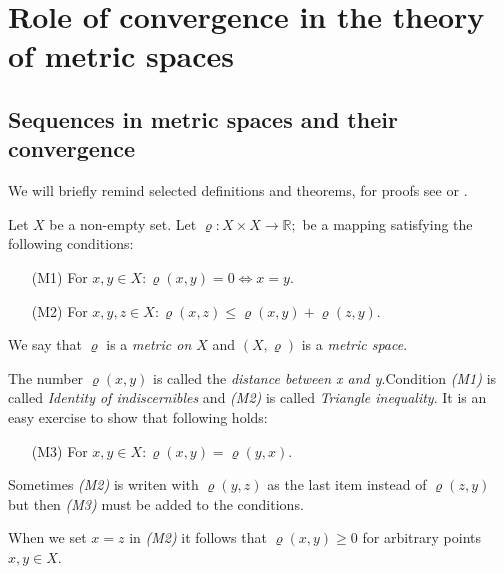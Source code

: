 \chapter{Role of convergence in the theory of metric spaces}

\section{Sequences in metric spaces and their convergence}

We will briefly remind selected definitions and theorems, for proofs see \cite{cech66} or \cite{copson88}.
\begin{define}\label{def:mp}
Let $X$ be a non-empty set. Let $\varrho: X\times X \to \mathbb{R};$ be a mapping satisfying the following conditions:
\begin{enumerate}
	\item[(M1)] For $x,y\in X: \varrho(x,y)=0 \Leftrightarrow x = y$.
	\item[(M2)] For $x,y,z\in X: \varrho(x,z) \le \varrho(x,y) + \varrho(z,y)$.
\end{enumerate}
We say that $\varrho$ is a \emph{metric on $X$} and $(X,\varrho)$ is a \emph{metric space}.
\end{define}
The number $\varrho(x,y)$ is called the \emph{distance between x and y}.Condition \emph{(M1)} is called \emph{Identity of indiscernibles} and \emph{(M2)} is called \emph{Triangle inequality}.  It is an easy exercise to show that following holds:
\begin{enumerate}
	\item[(M3)] For $x,y\in X: \varrho(x,y)=\varrho(y,x)$.
\end{enumerate}
Sometimes \emph{(M2)} is writen with $\varrho(y,z)$ as the last item instead of $\varrho(z,y)$ but then \emph{(M3)} must be added to the conditions.

When we set $x=z$ in \emph{(M2)} it follows that $\varrho(x,y)\ge0$ for arbitrary points $x,y\in X$.

